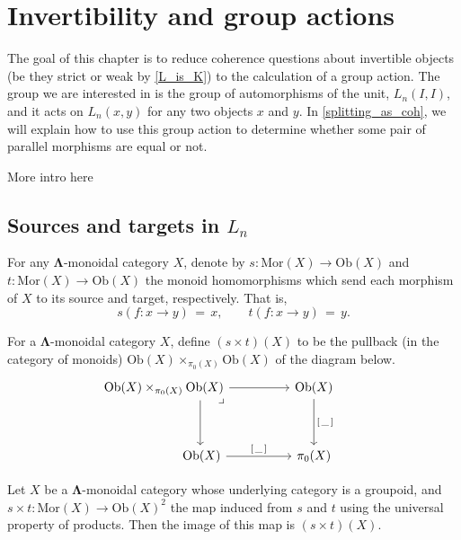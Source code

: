 \documentclass{amsbook} %
\newcommand{\ML}{\mathbf{\Lambda}}
\numberwithin{section}{chapter}
\begin{document}
\chapter{Invertibility and group actions}
The goal of this chapter is to reduce coherence questions about invertible objects (be they strict or weak by \cref{L_is_K}) to the calculation of a group action. The group we are interested in is the group of automorphisms of the unit, $L_n(I,I)$, and it acts on $L_n(x,y)$ for any two objects $x$ and $y$. In \cref{splitting_as_coh}, we will explain how to use this group action to determine whether some pair of parallel morphisms are equal or not.

More intro here

\section{Sources and targets in \texorpdfstring{$L_n$}{L_n}}   

\begin{Defi}\label{st} For any $\ML$-monoidal category $X$, denote by $s \colon  \mathrm{Mor}(X) \to \mathrm{Ob}(X)$ and $t \colon  \mathrm{Mor}(X) \to \mathrm{Ob}(X)$ the monoid homomorphisms which send each morphism of $X$ to its source and target, respectively. That is,
\[ s(f \colon  x \to y) \, = \, x, \quad \quad t(f \colon  x \to y) \, = \, y. \]
\end{Defi}

\begin{Defi}\label{s_times_t}
For a $\ML$-monoidal category $X$, define $(s \times t)(X)$ to be the pullback (in the category of monoids) $\mathrm{Ob}(X) \times_{\pi_0(X)} \mathrm{Ob}(X)$ of the diagram below. 
\[ \begin{tikzcd}
\mathrm{Ob}(X) \times_{\pi_0(X)} \mathrm{Ob}(X) \ar[dd, shift left=12] \ar[rr] \ar[ddrr, phantom, "\lrcorner", near start, shift left=4] & & \mathrm{Ob}(X) \ar[dd, "\lbrack \, \_ \, \rbrack"] & \\ 
& & & \\
\quad \quad \quad \quad \quad \quad \mathrm{Ob}(X) \ar[rr, "\lbrack \, \_ \, \rbrack"] & & \pi_0(X)
\end{tikzcd} \]
\end{Defi}

\begin{lem}\label{stmon} Let $X$ be a $\ML$-monoidal category whose underlying category is a groupoid, and $s \times t \colon  \mathrm{Mor}(X) \to \mathrm{Ob}(X)^2$ the map induced from $s$ and $t$ using the universal property of products. Then the image of this map is $(s \times t)(X)$.
\end{lem} 
\end{document}
